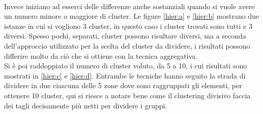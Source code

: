 \documentclass{llncs}
\newcommand{\acapo}{\vspace{0.5\baselineskip}\\}
\begin{document}
	\\
	Invece iniziano ad esserci delle differenze anche sostanziali quando si vuole avere un numero minore o maggiore di cluster.
	Le figure \ref{hier:a} e \ref{hier:b} mostrano due istanze in cui si vogliono 3 cluster, in questo caso i cluster trovati sono tutti e 3 diversi.
	Spesso pochi, separati, cluster possono risultare diversi, ma a seconda dell'approccio utilizzato per la scelta del cluster da dividere, 
	i risultati possono differire molto da ciò che si ottiene con la tecnica aggregativa.
	\acapo
	Si è poi raddoppiato il numero di cluster voluto, da 5 a 10, i cui risultati sono mostrati in \ref{hier:c} e \ref{hier:d}.
	Entrambe le tecniche hanno seguito la strada di dividere in due ciascuna delle 5 zone dove sono raggruppati gli elementi, per ottenere 10 cluster,
	qui si riesce a notare bene come il clustering divisivo faccia dei tagli decisamente più netti per dividere i gruppi.
\end{document}
